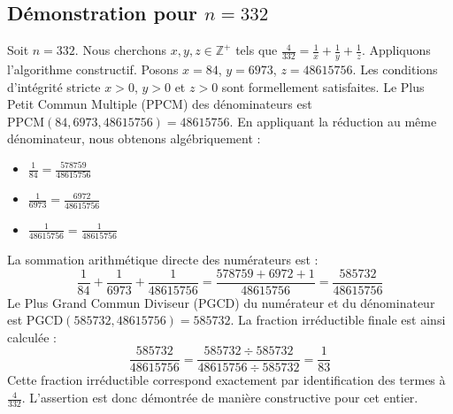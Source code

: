 \documentclass[11pt,a4paper]{article}
\begin{document}
\subsection{Démonstration pour $n = 332$}
Soit $n = 332$. Nous cherchons $x, y, z \in \mathbb{Z}^{+}$ tels que $\frac{4}{332} = \frac{1}{x} + \frac{1}{y} + \frac{1}{z}$.
Appliquons l'algorithme constructif. Posons $x = 84$, $y = 6973$, $z = 48615756$.
Les conditions d'intégrité stricte $x > 0$, $y > 0$ et $z > 0$ sont formellement satisfaites.
Le Plus Petit Commun Multiple (PPCM) des dénominateurs est $\text{PPCM}(84, 6973, 48615756) = 48615756$.
En appliquant la réduction au même dénominateur, nous obtenons algébriquement :
\begin{itemize}
    \item $\frac{1}{84} = \frac{578759}{48615756}$
    \item $\frac{1}{6973} = \frac{6972}{48615756}$
    \item $\frac{1}{48615756} = \frac{1}{48615756}$
\end{itemize}
La sommation arithmétique directe des numérateurs est :
$$ \frac{1}{84} + \frac{1}{6973} + \frac{1}{48615756} = \frac{578759 + 6972 + 1}{48615756} = \frac{585732}{48615756} $$
Le Plus Grand Commun Diviseur (PGCD) du numérateur et du dénominateur est $\text{PGCD}(585732, 48615756) = 585732$.
La fraction irréductible finale est ainsi calculée :
$$ \frac{585732}{48615756} = \frac{585732 \div 585732}{48615756 \div 585732} = \frac{1}{83} $$
Cette fraction irréductible correspond exactement par identification des termes à $\frac{4}{332}$. L'assertion est donc démontrée de manière constructive pour cet entier.
\end{document}
